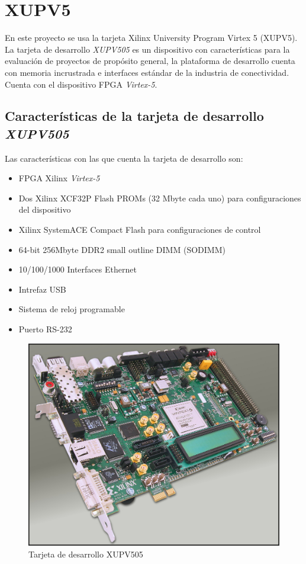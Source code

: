 \section{XUPV5}

En este proyecto se usa la tarjeta Xilinx University Program Virtex 5 (XUPV5).
La tarjeta de desarrollo \emph{XUPV505} es un dispositivo con características
para la evaluación de proyectos de  propósito general, la plataforma de
desarrollo cuenta con memoria incrustrada e interfaces estándar de la industria
de conectividad. Cuenta con el dispositivo FPGA \emph{Virtex-5}.

\subsection{Características de la  tarjeta de desarrollo \emph{XUPV505} }

Las características con las que cuenta la tarjeta de desarrollo son:

\begin{itemize}
 \item FPGA Xilinx \emph{Virtex-5}  
 \item Dos Xilinx XCF32P Flash PROMs (32 Mbyte cada uno) para
configuraciones del dispositivo
 \item Xilinx SystemACE Compact Flash para configuraciones de control
 \item 64-bit 256Mbyte DDR2 small outline DIMM (SODIMM)
 \item 10/100/1000  Interfaces Ethernet 
 \item Intrefaz USB
 \item Sistema de reloj programable
 \item Puerto RS-232
\end{itemize}


\begin{figure}[h!]
 \centering
 \includegraphics[scale=.30]{./figuras/V5.jpg}
  \caption{Tarjeta de desarrollo XUPV505}
 \label{XUPV505}
\end{figure}
